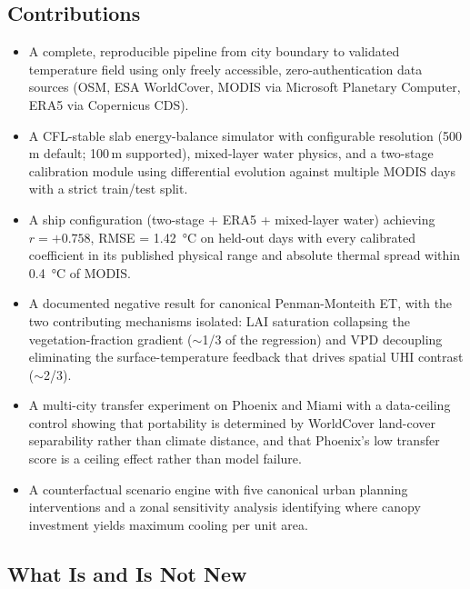\documentclass[12pt, letterpaper]{article}
\begin{document}
\subsection{Contributions}

\begin{itemize}[noitemsep]
  \item A complete, reproducible pipeline from city boundary to validated
        temperature field using only freely accessible, zero-authentication
        data sources (OSM, ESA WorldCover, MODIS via Microsoft Planetary
        Computer, ERA5 via Copernicus CDS).
  \item A CFL-stable slab energy-balance simulator with configurable
        resolution (500\,m default; 100\,m supported), mixed-layer water
        physics, and a two-stage calibration module using differential
        evolution against multiple MODIS days with a strict train/test split.
  \item A ship configuration (two-stage + ERA5 + mixed-layer water) achieving
        $r = +0.758$, RMSE = \SI{1.42}{\degreeCelsius} on held-out days with
        every calibrated coefficient in its published physical range and
        absolute thermal spread within \SI{0.4}{\degreeCelsius} of MODIS.
  \item A documented negative result for canonical Penman-Monteith ET,
        with the two contributing mechanisms isolated: LAI saturation
        collapsing the vegetation-fraction gradient ($\sim$1/3 of the
        regression) and VPD decoupling eliminating the surface-temperature
        feedback that drives spatial UHI contrast ($\sim$2/3).
  \item A multi-city transfer experiment on Phoenix and Miami with a
        data-ceiling control showing that portability is determined by
        WorldCover land-cover separability rather than climate distance,
        and that Phoenix's low transfer score is a ceiling effect rather
        than model failure.
  \item A counterfactual scenario engine with five canonical urban planning
        interventions and a zonal sensitivity analysis identifying where
        canopy investment yields maximum cooling per unit area.
\end{itemize}

\subsection{What Is and Is Not New}
\label{sec:novelty}
\end{document}
